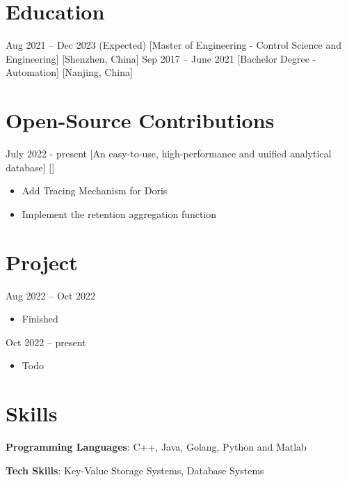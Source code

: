 \documentclass{chicv}
\begin{document}
\begin{basicinfo}
\end{basicinfo}

\section{Education}
  {Aug 2021 -- Dec 2023 (Expected)}
  [Master of Engineering - Control Science and Engineering]
  [Shenzhen, China]
  {Sep 2017 -- June 2021}
  [Bachelor Degree - Automation]
  [Nanjing, China]




\section{Open-Source Contributions}

  {July 2022 - present}
  [An easy-to-use, high-performance and unified analytical database]
  []
  \begin{itemize}
    \item  Add Tracing Mechanism for Doris
    \item  Implement the retention aggregation function
  \end{itemize}

\section{Project}

{Aug 2022 –  Oct 2022}

\begin{itemize}
	\item Finished
\end{itemize}

{Oct 2022 –  present}

\begin{itemize}
	\item Todo
\end{itemize}


\section{Skills}

\begin{compactlist}
  \item \textbf{Programming Languages}: C++, Java, Golang, Python and Matlab
  \item \textbf{Tech Skills}: Key-Value Storage Systems, Database Systems
\end{compactlist}
\end{document}
